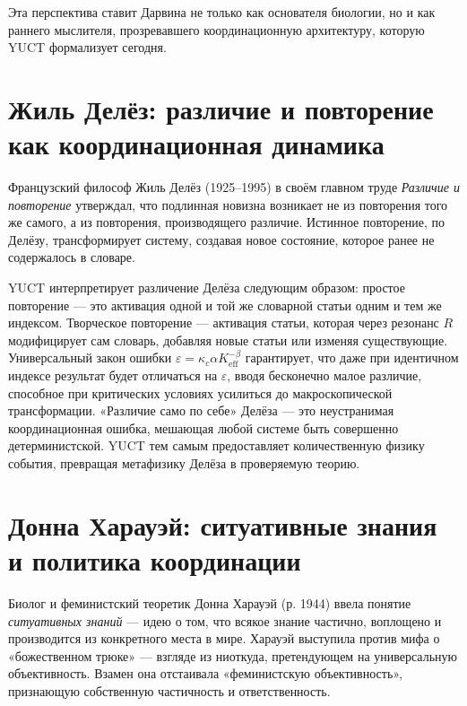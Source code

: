 \documentclass[12pt,a4paper]{article}
\begin{document}
	Эта перспектива ставит Дарвина не только как основателя биологии, но и как раннего мыслителя, прозревавшего координационную архитектуру, которую YUCT формализует сегодня.
	
	\section{Жиль Делёз: различие и повторение как координационная динамика}
	
	Французский философ Жиль Делёз (1925–1995) в своём главном труде \emph{Различие и повторение} утверждал, что подлинная новизна возникает не из повторения того же самого, а из повторения, производящего различие. Истинное повторение, по Делёзу, трансформирует систему, создавая новое состояние, которое ранее не содержалось в словаре.
	
	YUCT интерпретирует различение Делёза следующим образом: простое повторение — это активация одной и той же словарной статьи одним и тем же индексом. Творческое повторение — активация статьи, которая через резонанс \(R\) модифицирует сам словарь, добавляя новые статьи или изменяя существующие. Универсальный закон ошибки \(\varepsilon = \kappa_c \alpha K_{\mathrm{eff}}^{-\beta}\) гарантирует, что даже при идентичном индексе результат будет отличаться на \(\varepsilon\), вводя бесконечно малое различие, способное при критических условиях усилиться до макроскопической трансформации. «Различие само по себе» Делёза — это неустранимая координационная ошибка, мешающая любой системе быть совершенно детерминистской. YUCT тем самым предоставляет количественную физику события, превращая метафизику Делёза в проверяемую теорию.
	
	\section{Донна Харауэй: ситуативные знания и политика координации}
	
	Биолог и феминистский теоретик Донна Харауэй (р. 1944) ввела понятие \emph{ситуативных знаний} — идею о том, что всякое знание частично, воплощено и производится из конкретного места в мире. Харауэй выступила против мифа о «божественном трюке» — взгляде из ниоткуда, претендующем на универсальную объективность. Взамен она отстаивала «феминистскую объективность», признающую собственную частичность и ответственность.
	
\end{document}
